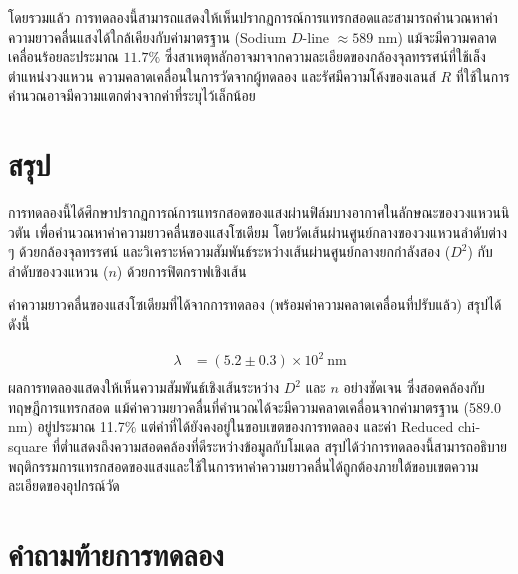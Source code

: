 \documentclass[11pt,a4paper]{article}
\begin{document}
\newline
\medskip

โดยรวมแล้ว การทดลองนี้สามารถแสดงให้เห็นปรากฏการณ์การแทรกสอดและสามารถคำนวณหาค่าความยาวคลื่นแสงได้ใกล้เคียงกับค่ามาตรฐาน (Sodium $D$-line $\approx 589$ nm) แม้จะมีความคลาดเคลื่อนร้อยละประมาณ $11.7\%$ ซึ่งสาเหตุหลักอาจมาจากความละเอียดของกล้องจุลทรรศน์ที่ใช้เล็งตำแหน่งวงแหวน ความคลาดเคลื่อนในการวัดจากผู้ทดลอง และรัศมีความโค้งของเลนส์ $R$ ที่ใช้ในการคำนวณอาจมีความแตกต่างจากค่าที่ระบุไว้เล็กน้อย



\newpage
\section{สรุป} \label{conclusion}

การทดลองนี้ได้ศึกษาปรากฏการณ์การแทรกสอดของแสงผ่านฟิล์มบางอากาศในลักษณะของวงแหวนนิวตัน เพื่อคำนวณหาค่าความยาวคลื่นของแสงโซเดียม โดยวัดเส้นผ่านศูนย์กลางของวงแหวนลำดับต่าง ๆ ด้วยกล้องจุลทรรศน์ และวิเคราะห์ความสัมพันธ์ระหว่างเส้นผ่านศูนย์กลางยกกำลังสอง ($D^2$) กับลำดับของวงแหวน ($n$) ด้วยการฟิตกราฟเชิงเส้น



ค่าความยาวคลื่นของแสงโซเดียมที่ได้จากการทดลอง (พร้อมค่าความคลาดเคลื่อนที่ปรับแล้ว) สรุปได้ดังนี้

\begin{align*}
\lambda &= (5.2 \pm 0.3) \times 10^2 \ \text{nm} \\
\end{align*}
ผลการทดลองแสดงให้เห็นความสัมพันธ์เชิงเส้นระหว่าง $D^2$ และ $n$ อย่างชัดเจน ซึ่งสอดคล้องกับทฤษฎีการแทรกสอด แม้ค่าความยาวคลื่นที่คำนวณได้จะมีความคลาดเคลื่อนจากค่ามาตรฐาน (589.0 nm) อยู่ประมาณ 11.7\% แต่ค่าที่ได้ยังคงอยู่ในขอบเขตของการทดลอง และค่า Reduced chi-square ที่ต่ำแสดงถึงความสอดคล้องที่ดีระหว่างข้อมูลกับโมเดล สรุปได้ว่าการทดลองนี้สามารถอธิบายพฤติกรรมการแทรกสอดของแสงและใช้ในการหาค่าความยาวคลื่นได้ถูกต้องภายใต้ขอบเขตความละเอียดของอุปกรณ์วัด

\newpage
\section*{คำถามท้ายการทดลอง}
\end{document}
